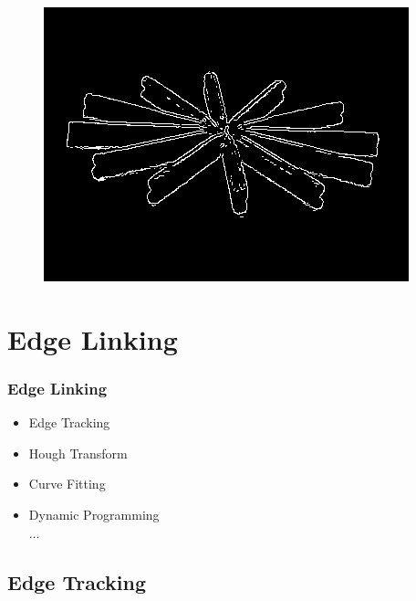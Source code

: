 \documentclass[notheorems,serif,table,compress]{beamer}  %
\begin{document}
\begin{frame}
\begin{figure}
\begin{minipage}[t]{0.35\linewidth}
            \end{minipage}
        \end{figure}
        \begin{figure}
            \includegraphics[width=0.35\linewidth]{cannyResult.png} 
        \end{figure}
\end{frame}


\section{Edge Linking}



\begin{frame}
\frametitle{Edge Linking}
    \begin{itemize}
        \item Edge Tracking
        \item Hough Transform
        \item Curve Fitting
        \item Dynamic Programming\\
        $\dots$
    \end{itemize}
\end{frame}
  
  
\subsection{Edge Tracking}
\end{document}
